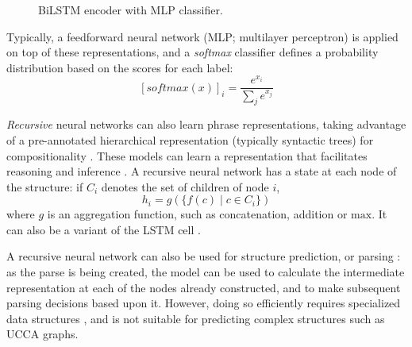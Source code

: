 \documentclass[12pt,a4paper,table]{report}
\renewcommand\cite{\citep}      %
\begin{document}
\begin{figure}\centering
{}
\caption{BiLSTM encoder with MLP classifier.}\label{fig:bilstm}
\end{figure}

Typically, a feedforward neural network (MLP; multilayer perceptron) is applied on top
of these representations, and a \textit{softmax} classifier defines a probability
distribution based on the scores for each label:
\[[softmax(x)]_i = \frac{e^{x_i}}{\sum_je^{x_j}}\]

\textit{Recursive} neural networks can also learn phrase representations, taking advantage
of a pre-annotated hierarchical representation (typically syntactic trees) for
compositionality \cite{socher2010learning}.
These models can learn a representation that facilitates reasoning and inference \cite{bowman2014recursive}.
A recursive neural network has a state at each node of the structure: if $C_i$ denotes the set of children of
node $i$,
\[
  h_i=g(\{f(c)\;|\;c\in C_i\})
\]
where $g$ is an aggregation function, such as concatenation, addition or $\mathrm{max}$.
It can also be a variant of the LSTM cell \cite{tai-etal-2015-improved}.

A recursive neural network can also be used for structure prediction, or parsing
\cite{socher2013recursive,dyer2015transition}: as the parse is being created, the model can
be used to calculate the intermediate representation at each of the nodes already constructed,
and to make subsequent parsing decisions based upon it.
However, doing so efficiently requires specialized data structures \cite{bowman2016fast},
and is not suitable for predicting complex structures such as UCCA graphs.
\end{document}
